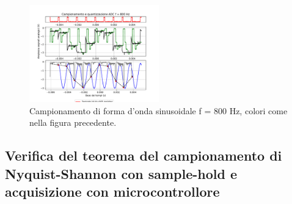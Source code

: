 \documentclass[journal]{IEEEtran}
\begin{document}
\vspace{-10mm}
%
\begin{figure}[H]%
\begin{center}
\includegraphics[trim={0 40 0 0}, clip,width=0.50\textwidth]{analysis/output/campionamento_800Hz.pdf}
\caption{Campionamento di forma d'onda sinusoidale f = 800 Hz, colori come nella figura precedente.}
\label{fig:sampSH6}
\end{center}
\end{figure}

\subsection{Verifica del teorema del campionamento di Nyquist-Shannon con sample-hold e acquisizione con microcontrollore}

\end{document}
